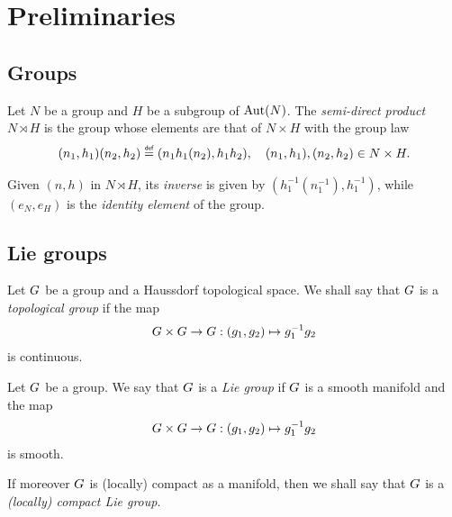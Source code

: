 \chapter{Preliminaries}

\section{Groups}

\begin{definition}
\label{definition:semi-direct_products}
    Let $N$ be a group and $H$ be a subgroup of $\operatorname{Aut}(N)$.
    The \emph{semi-direct product} $N \rtimes H$ is the group whose elements are that of $N \times H$ with the group law
    \begin{align}
        (n_1, h_1) (n_2, h_2) \defeq (n_1 h_1(n_2), h_1 h_2), \quad (n_1, h_1), (n_2, h_2) \in N \times H.
    \end{align}

    Given $(n, h)$ in $N \rtimes H$, its \emph{inverse} is given by $(h_1^{-1}(n_1^{-1}), h_1^{-1})$,
    while $(e_N, e_H)$ is the \emph{identity element} of the group.
\end{definition}

\section{Lie groups}

\begin{definition}
\label{definition:topological_group}
    Let $G$ be a group and a Haussdorf topological space.
    We shall say that $G$ is a \emph{topological group} if the map
    \begin{align*}
        G \times G \to G :
        (g_1, g_2) \mapsto g_1^{-1} g_2
    \end{align*}
    is continuous.
\end{definition}

\begin{definition}
\label{definition:Lie_group}
    Let $G$ be a group.
    We say that $G$ is a \emph{Lie group}
    if $G$ is a smooth manifold and the map
    \begin{align*}
        G \times G \to G :
        (g_1, g_2) \mapsto g_1^{-1} g_2
    \end{align*}
    is smooth.

    If moreover $G$ is (locally) compact as a manifold,
    then we shall say that $G$ is a \emph{(locally) compact Lie group}.
\end{definition}

